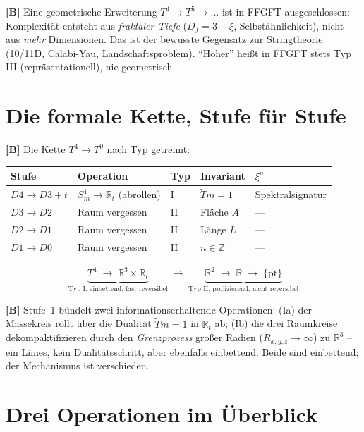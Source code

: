\textbf{[B]} Eine geometrische Erweiterung $T^4\to T^5\to\dots$ ist in FFGFT
ausgeschlossen: Komplexität entsteht aus \emph{fraktaler Tiefe}
($D_f=3-\xi$, Selbstähnlichkeit), nicht aus \emph{mehr} Dimensionen. Das ist der
bewusste Gegensatz zur Stringtheorie (10/11D, Calabi-Yau,
Landschaftsproblem). \enquote{Höher} heißt in FFGFT stets Typ III
(repräsentationell), nie geometrisch.

\section{Die formale Kette, Stufe für Stufe}

\textbf{[B]} Die Kette $T^4\to T^0$ nach Typ getrennt:

\begin{center}
\renewcommand{\arraystretch}{1.35}
{\small
\begin{tabular}{lllll}
\toprule
\textbf{Stufe} & \textbf{Operation} & \textbf{Typ} & \textbf{Invariant} & \textbf{$\xi^n$} \\
\midrule
$D4\to D3{+}t$ & $S^1_m\to\mathbb{R}_t$ (abrollen) & I & $\tilde Tm=1$ & Spektralsignatur \\
$D3\to D2$ & Raum vergessen & II & Fläche $A$ & --- \\
$D2\to D1$ & Raum vergessen & II & Länge $L$ & --- \\
$D1\to D0$ & Raum vergessen & II & $n\in\mathbb{Z}$ & --- \\
\bottomrule
\end{tabular}
}
\renewcommand{\arraystretch}{1.0}
\end{center}

\[
\underbrace{T^4\;\longrightarrow\;\mathbb{R}^3\times\mathbb{R}_t}_{\text{Typ I: einbettend, fast reversibel}}
\;\longrightarrow\;
\underbrace{\mathbb{R}^2\;\longrightarrow\;\mathbb{R}\;\longrightarrow\;\{\mathrm{pt}\}}_{\text{Typ II: projizierend, nicht reversibel}}
\]

\textbf{[B]} Stufe~1 bündelt zwei informationserhaltende Operationen: (Ia) der
Massekreis rollt über die Dualität $\tilde Tm=1$ in $\mathbb{R}_t$ ab; (Ib) die
drei Raumkreise dekompaktifizieren durch den \emph{Grenzprozess} großer Radien
($R_{x,y,z}\to\infty$) zu $\mathbb{R}^3$ -- ein Limes, kein
Dualitätsschritt, aber ebenfalls einbettend. Beide sind einbettend; der
Mechanismus ist verschieden.

\section{Drei Operationen im Überblick}

